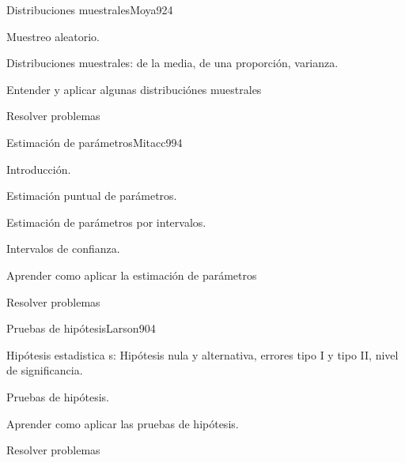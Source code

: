 \begin{syllabus}
\begin{unit}{Distribuciones muestrales}{Moya92}{4}
   \begin{topics}
         \item  Muestreo aleatorio.
	 \item  Distribuciones muestrales: de la media, de una proporción, varianza.
   \end{topics}

   \begin{unitgoals}
         \item  Entender y aplicar algunas distribuciónes muestrales
         \item  Resolver problemas
   \end{unitgoals}
\end{unit}

\begin{unit}{Estimación de parámetros}{Mitacc99}{4}
   \begin{topics}
         \item  Introducción.
	 \item  Estimación puntual de parámetros.
	\item Estimación de parámetros por intervalos.
	\item Intervalos de confianza.
   \end{topics}

   \begin{unitgoals}
         \item  Aprender como aplicar la estimación de parámetros
         \item  Resolver problemas
   \end{unitgoals}
\end{unit}

\begin{unit}{Pruebas de hipótesis}{Larson90}{4}
   \begin{topics}
         \item  Hipótesis estadistica s: Hipótesis nula y alternativa, errores tipo I y tipo II, nivel de significancia.
	 \item  Pruebas de hipótesis.
   \end{topics}

   \begin{unitgoals}
         \item  Aprender como aplicar las pruebas de hipótesis.
         \item  Resolver problemas
   \end{unitgoals}
\end{unit}

\begin{coursebibliography}
\end{coursebibliography}

\end{syllabus}
